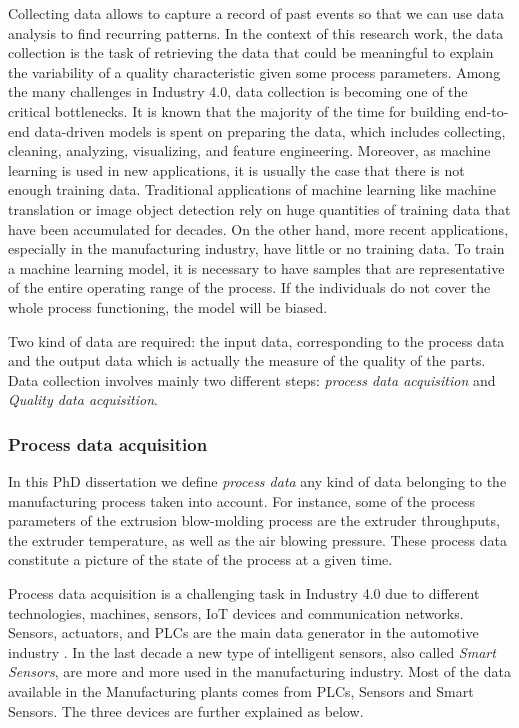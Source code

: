 Collecting data allows to capture a record of past events so that we can use data analysis to find recurring patterns. In the context of this research work, the data collection is the task of retrieving the data that could be meaningful to explain the variability of a quality characteristic given some process parameters. Among the many challenges in Industry 4.0, data collection is becoming one of the critical bottlenecks. It is known that the majority of the time for building end-to-end data-driven models is spent on preparing the data, which includes collecting, cleaning, analyzing, visualizing, and feature engineering. Moreover, as machine learning is used in new applications, it is usually the case that there is not enough training data. Traditional applications of machine learning like machine translation or image object detection rely on huge quantities of training data that have been accumulated for decades. On the other hand, more recent applications, especially in the manufacturing industry, have little or no training data. To train a machine learning model, it is necessary to have samples that are representative of the entire operating range of the process. If the individuals do not cover the whole process functioning, the model will be biased.

Two kind of data are required: the input data, corresponding to the process data and the output data which is actually the measure of the quality of the parts. Data collection involves mainly two different steps: \textit{process data acquisition} and \textit{Quality data acquisition}. 

\subsubsection{Process data acquisition} \label{Process Data Acquisition}

In this PhD dissertation we define \textit{process data} any kind of data belonging to the manufacturing process taken into account. For instance, some of the process parameters of the extrusion blow-molding process are the extruder throughputs, the extruder temperature, as well as the air blowing pressure. These process data constitute a picture of the state of the process at a given time.

Process data acquisition is a challenging task in Industry 4.0 due to different technologies, machines, sensors, IoT devices and communication networks. Sensors, actuators, and PLCs are the main data generator in the automotive industry \citep{khan2017big}. In the last decade a new type of intelligent sensors, also called \textit{Smart Sensors}, are more and more used in the manufacturing industry. Most of the data available in the Manufacturing plants comes from PLCs, Sensors and Smart Sensors. The three devices are further explained as below.

